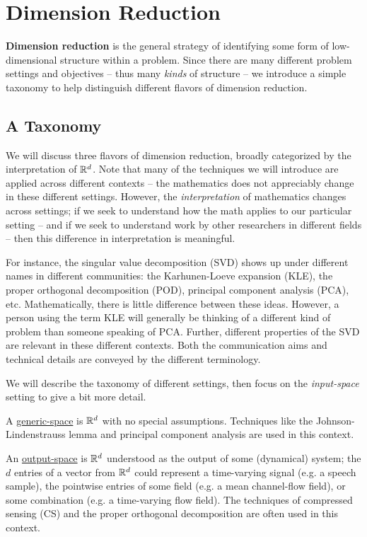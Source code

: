\documentclass{article}
\begin{document}
\section{Dimension Reduction}

\textbf{Dimension reduction} is the general strategy of identifying some form of
low-dimensional structure within a problem. Since there are many different
problem settings and objectives -- thus many \emph{kinds} of structure -- we
introduce a simple taxonomy to help distinguish different flavors of dimension
reduction.

\subsection{A Taxonomy}
We will discuss three flavors of dimension reduction, broadly categorized by the
interpretation of $\mathbb{R}^{d}$. Note that many of the techniques we will introduce
are applied across different contexts -- the mathematics does not appreciably
change in these different settings. However, the \emph{interpretation} of
mathematics changes across settings; if we seek to understand how the math
applies to our particular setting -- and if we seek to understand work by other
researchers in different fields -- then this difference in interpretation is
meaningful.

For instance, the singular value decomposition (SVD) shows up under different
names in different communities: the Karhunen-Loeve expansion (KLE), the proper
orthogonal decomposition (POD), principal component analysis (PCA), etc.
Mathematically, there is little difference between these ideas. However, a
person using the term KLE will generally be thinking of a different kind of
problem than someone speaking of PCA. Further, different properties of the SVD
are relevant in these different contexts. Both the communication aims and
technical details are conveyed by the different terminology.

We will describe the taxonomy of different settings, then focus on the
\emph{input-space} setting to give a bit more detail.

\bigskip\noindent A \underline{generic-space} is $\mathbb{R}^{d}$ with no special
assumptions. Techniques like the Johnson-Lindenstrauss lemma and principal
component analysis\cite{fodor2002survey} are used in this context.

\bigskip\noindent An \underline{output-space} is $\mathbb{R}^{d}$ understood as the
output of some (dynamical) system; the $d$ entries of a vector from $\mathbb{R}^{d}$
could represent a time-varying signal (e.g. a speech sample), the pointwise
entries of some field (e.g. a mean channel-flow field), or some combination
(e.g. a time-varying flow field). The techniques of compressed sensing
(CS)\cite{candes2008introduction} and the proper orthogonal
decomposition\cite{lumley2007} are often used in this context.
\end{document}
